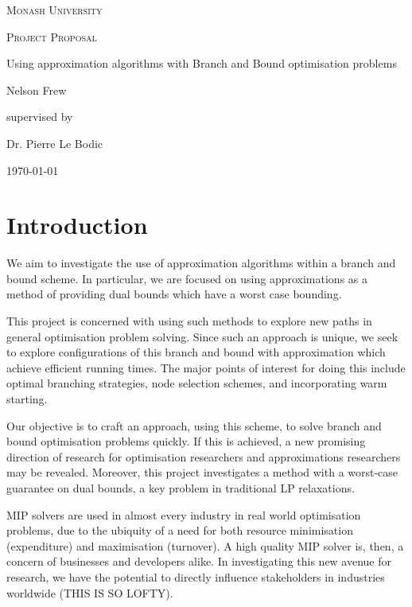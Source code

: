 \documentclass[12pt, a4paper]{article}
\begin{document}
\begin{titlepage}
  \centering
  {\scshape\LARGE Monash University \par}
  \vspace{1cm}
  {\scshape\Large Project Proposal \par}
  \vspace{1.5cm}
  {\huge Using approximation algorithms with Branch and Bound optimisation problems\par}
  \vspace{2cm}
  {\Large Nelson Frew\par}
  \vfill
  supervised by\par
  Dr. Pierre Le Bodic
  \vfill
  {\large \today\par}
\end{titlepage}
\tableofcontents
\newpage
\section{Introduction}
We aim to investigate the use of approximation algorithms within a branch and bound scheme. In particular, we are focused on using approximations as a method of providing dual bounds which have a worst case bounding. 

This project is concerned with using such methods to explore new paths in general optimisation problem solving. Since such an approach is unique, we seek to explore configurations of this branch and bound with approximation which achieve efficient running times. The major points of interest for doing this include optimal branching strategies, node selection schemes, and incorporating warm starting.

Our objective is to craft an approach, using this scheme, to solve branch and bound optimisation problems quickly. If this is achieved, a new promising direction of research for optimisation researchers and approximations researchers may be revealed. Moreover, this project investigates a method with a worst-case guarantee on dual bounds, a key problem in traditional LP relaxations.

MIP solvers are used in almost every industry in real world optimisation problems, due to the ubiquity of a need for both resource minimisation (expenditure) and maximisation (turnover). A high quality MIP solver is, then, a concern of businesses and developers alike. In investigating this new avenue for research, we have the potential to directly influence stakeholders in industries worldwide (THIS IS SO LOFTY).
\end{document}
